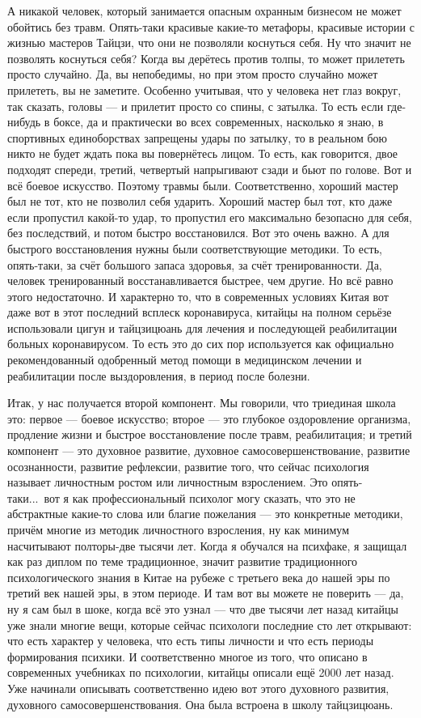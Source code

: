 А никакой человек, который 
занимается опасным охранным бизнесом не может обойтись без травм. Опять-таки красивые 
какие-то метафоры, красивые истории с жизнью мастеров Тайцзи, что они не позволяли коснуться 
себя. Ну что значит не позволять коснуться себя? Когда вы дерётесь против толпы, то может 
прилететь просто случайно. Да, вы непобедимы, но при этом просто случайно может прилететь, вы 
не заметите. Особенно учитывая, что у человека нет глаз вокруг, так сказать, головы --- и 
прилетит просто со спины, с затылка. То есть если где-нибудь в боксе, да и практически во всех 
современных, насколько я знаю, в спортивных единоборствах запрещены удары по затылку, то в 
реальном бою никто не будет ждать пока вы повернётесь лицом. То есть, как говорится, двое 
подходят спереди, третий, четвертый напрыгивают сзади и бьют по голове. Вот и всё боевое 
искусство. Поэтому травмы были. Соответственно, хороший мастер был не тот, кто не позволил 
себя ударить. Хороший мастер был тот, кто даже если пропустил какой-то удар, то пропустил его 
максимально безопасно для себя, без последствий, и потом быстро восстановился. Вот это очень 
важно. А для быстрого восстановления нужны были соответствующие методики. То есть, 
опять-таки, за счёт большого запаса здоровья, за счёт тренированности. Да, человек 
тренированный восстанавливается быстрее, чем другие. Но всё равно этого недостаточно. И 
характерно то, что в современных условиях Китая вот даже вот в этот последний всплеск 
коронавируса, китайцы на полном серьёзе использовали цигун и тайцзицюань для лечения 
и последующей реабилитации больных коронавирусом. То есть это до сих пор используется как 
официально рекомендованный одобренный метод помощи в медицинском лечении и реабилитации
после выздоровления, в период после болезни.

Итак, у нас получается второй компонент. Мы говорили, что триединая школа это: первое --- боевое
искусство; второе --- это глубокое 
оздоровление организма, продление жизни и быстрое восстановление после травм, реабилитация;
и третий компонент --- это духовное развитие, духовное самосовершенствование, развитие 
осознанности, развитие рефлексии, развитие того, что сейчас психология называет 
личностным ростом или личностным взрослением. Это опять-таки...\ вот я как профессиональный 
психолог могу сказать, что это не абстрактные какие-то слова или благие пожелания --- это 
конкретные методики, причём многие из методик личностного взросления, ну как минимум
насчитывают полторы-две тысячи лет. Когда я обучался на психфаке, я защищал как раз диплом по 
теме традиционное, значит развитие традиционного психологического знания в Китае
на рубеже с третьего века до нашей эры по третий век нашей эры, в этом периоде. И там вот вы 
можете не поверить --- да, ну я сам был в шоке, когда всё это узнал --- что две тысячи лет назад
китайцы уже знали многие вещи, которые сейчас психологи последние сто лет открывают: что есть 
характер у человека, что есть типы личности и что есть периоды формирования психики. И 
соответственно многое из того, что описано в современных учебниках по психологии, китайцы 
описали ещё 2000 лет назад. Уже начинали описывать соответственно идею вот 
этого духовного развития, духовного самосовершенствования. Она была встроена в школу тайцзицюань.

